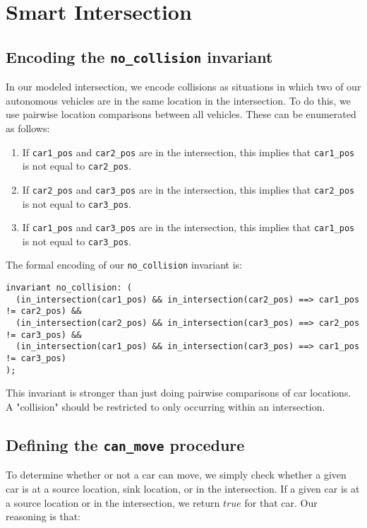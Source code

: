 \documentclass{article}
\newcommand{\code}[1]{\texttt{#1}}
\begin{document}
\section{Smart Intersection}

\subsection{Encoding the \code{no\_collision} invariant}

In our modeled intersection, we encode collisions as situations in which two of our autonomous vehicles are in the same location in the intersection. To do this, we use pairwise location comparisons between all vehicles. These can be enumerated as follows:

\begin{enumerate}
  \item If \code{car1\_pos} and \code{car2\_pos} are in the intersection, this implies that \code{car1\_pos} is not equal to \code{car2\_pos}.
  \item If \code{car2\_pos} and \code{car3\_pos} are in the intersection, this implies that \code{car2\_pos} is not equal to \code{car3\_pos}.
  \item If \code{car1\_pos} and \code{car3\_pos} are in the intersection, this implies that \code{car1\_pos} is not equal to \code{car3\_pos}.
\end{enumerate}

The formal encoding of our \code{no\_collision} invariant is:

\begin{lstlisting}
invariant no_collision: (
  (in_intersection(car1_pos) && in_intersection(car2_pos) ==> car1_pos != car2_pos) &&
  (in_intersection(car2_pos) && in_intersection(car3_pos) ==> car2_pos != car3_pos) &&
  (in_intersection(car1_pos) && in_intersection(car3_pos) ==> car1_pos != car3_pos)
);
\end{lstlisting}

This invariant is stronger than just doing pairwise comparisons of car locations. A "collision" should be restricted to only occurring within an intersection.

\subsection{Defining the \code{can\_move} procedure}

To determine whether or not a car can move, we simply check whether a given car is at a source location, sink location, or in the intersection. If a given car is at a source location or in the intersection, we return $true$ for that car. Our reasoning is that:
\end{document}
